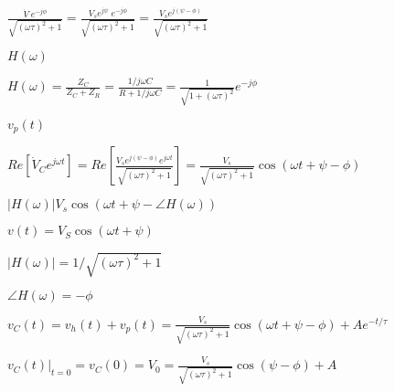\documentclass{article}
\def\lthtmlcheckvsize{\ifdim\ht\sizebox<\vsize 
  \ifdim\wd\sizebox<\hsize\expandafter\hfill\fi \expandafter\vfill
  \else\expandafter\vss\fi}%
\begin{document}
{\newpage\clearpage
{}%
$\displaystyle \frac{\dot{V}\;e^{-j\phi}}{\sqrt{(\omega \tau)^2+1}}
=\frac{V_se^{j\psi}\;e^{-j\phi}}{\sqrt{(\omega \tau)^2+1}}
=\frac{V_se^{j(\psi-\phi)}}{\sqrt{(\omega \tau)^2+1}}$%
\lthtmlindisplaymathZ
\lthtmlcheckvsize\clearpage}

{\newpage\clearpage
{}%
$ H(\omega)$%
\lthtmlindisplaymathZ
\lthtmlcheckvsize\clearpage}

{\newpage\clearpage
{}%
$\displaystyle H(\omega)=\frac{Z_C}{Z_C+Z_R}=\frac{1/j\omega C}{R+1/j\omega C}
=\frac{1}{\sqrt{1+(\omega\tau)^2}} e^{-j\phi}$%
\lthtmlindisplaymathZ
\lthtmlcheckvsize\clearpage}

{\newpage\clearpage
{}%
$\displaystyle v_p(t)$%
\lthtmlindisplaymathZ
\lthtmlcheckvsize\clearpage}

{\newpage\clearpage
{}%
$\displaystyle Re\left[\dot{V}_C e^{j\omega t} \right]
=Re\left[ \frac{V_s e^{j(\psi-\phi)} e^{j\omega t}}{\sqrt{(\omega \tau)^2+1}} \right]
= \frac{V_s}{\sqrt{(\omega \tau)^2+1}} \cos(\omega t+\psi-\phi)$%
\lthtmlindisplaymathZ
\lthtmlcheckvsize\clearpage}

{\newpage\clearpage
{}%
$\displaystyle |H(\omega)|V_s\cos(\omega t+\psi-\angle H(\omega))$%
\lthtmlindisplaymathZ
\lthtmlcheckvsize\clearpage}

{\newpage\clearpage
{}%
$ v(t)=V_S\cos(\omega t+\psi)$%
\lthtmlindisplaymathZ
\lthtmlcheckvsize\clearpage}

{\newpage\clearpage
{}%
$ |H(\omega)|=1/\sqrt{(\omega\tau)^2+1}$%
\lthtmlindisplaymathZ
\lthtmlcheckvsize\clearpage}

{\newpage\clearpage
{}%
$ \angle H(\omega)=-\phi$%
\lthtmlindisplaymathZ
\lthtmlcheckvsize\clearpage}

{\newpage\clearpage
{}%
$\displaystyle v_C(t)=v_h(t)+v_p(t)=
\frac{V_s}{\sqrt{(\omega \tau)^2+1}}\cos(\omega t+\psi-\phi)+A e^{-t/\tau}$%
\lthtmlindisplaymathZ
\lthtmlcheckvsize\clearpage}

{\newpage\clearpage
{}%
$\displaystyle v_C(t)\bigg|_{t=0}=v_C(0)
=V_0=\frac{V_s}{\sqrt{(\omega \tau)^2+1}}\cos(\psi-\phi)+A$%
\lthtmlindisplaymathZ
\lthtmlcheckvsize\clearpage}
\end{document}
